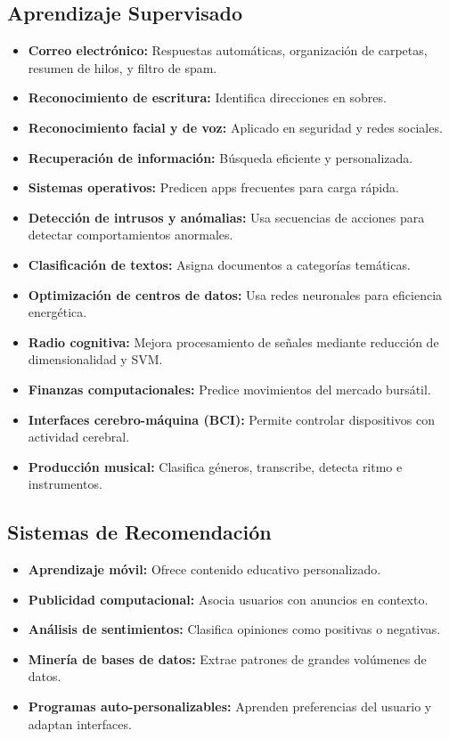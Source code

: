 \documentclass[12pt]{article}
\begin{document}
\subsection{Aprendizaje Supervisado}
\begin{itemize}
  \item \textbf{Correo electr\'onico:} Respuestas autom\'aticas, organizaci\'on de carpetas, resumen de hilos, y filtro de spam.
  \item \textbf{Reconocimiento de escritura:} Identifica direcciones en sobres.
  \item \textbf{Reconocimiento facial y de voz:} Aplicado en seguridad y redes sociales.
  \item \textbf{Recuperaci\'on de informaci\'on:} B\'usqueda eficiente y personalizada.
  \item \textbf{Sistemas operativos:} Predicen apps frecuentes para carga r\'apida.
  \item \textbf{Detecci\'on de intrusos y an\'omalias:} Usa secuencias de acciones para detectar comportamientos anormales.
  \item \textbf{Clasificaci\'on de textos:} Asigna documentos a categor\'ias tem\'aticas.
  \item \textbf{Optimizaci\'on de centros de datos:} Usa redes neuronales para eficiencia energ\'etica.
  \item \textbf{Radio cognitiva:} Mejora procesamiento de se\~nales mediante reducci\'on de dimensionalidad y SVM.
  \item \textbf{Finanzas computacionales:} Predice movimientos del mercado burs\'atil.
  \item \textbf{Interfaces cerebro-m\'aquina (BCI):} Permite controlar dispositivos con actividad cerebral.
  \item \textbf{Producci\'on musical:} Clasifica g\'eneros, transcribe, detecta ritmo e instrumentos.
\end{itemize}

\subsection{Sistemas de Recomendaci\'on}
\begin{itemize}
  \item \textbf{Aprendizaje m\'ovil:} Ofrece contenido educativo personalizado.
  \item \textbf{Publicidad computacional:} Asocia usuarios con anuncios en contexto.
  \item \textbf{An\'alisis de sentimientos:} Clasifica opiniones como positivas o negativas.
  \item \textbf{Miner\'ia de bases de datos:} Extrae patrones de grandes vol\'umenes de datos.
  \item \textbf{Programas auto-personalizables:} Aprenden preferencias del usuario y adaptan interfaces.
\end{itemize}
\end{document}
